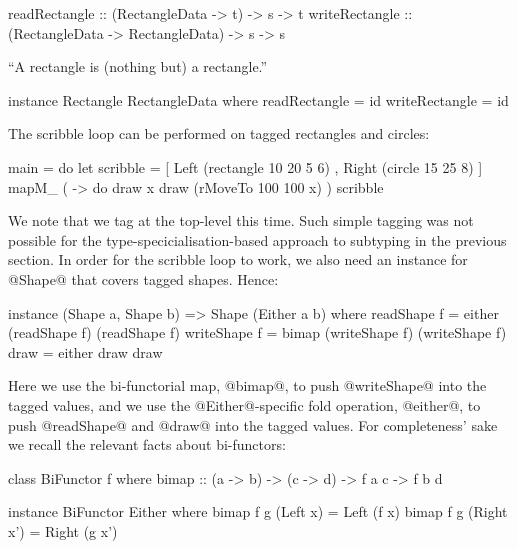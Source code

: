\documentclass{jfp}
\begin{document}
\begin{code}
   readRectangle  :: (RectangleData -> t)         -> s -> t
   writeRectangle :: (RectangleData -> RectangleData) -> s -> s
\end{code}

``A rectangle is (nothing but) a rectangle.''

\begin{code}
 instance Rectangle RectangleData
  where
   readRectangle  = id
   writeRectangle = id
\end{code}

The scribble loop can be performed on tagged rectangles and circles:

\begin{code}
 main =
       do
          let scribble = [ Left  (rectangle 10 20 5 6)
                         , Right (circle 15 25 8)
                         ]
          mapM_ ( \x -> 
                    do
                       draw x
                       draw (rMoveTo 100 100 x)
                )
                scribble
\end{code}

We note that we tag at the top-level this time. Such simple tagging
was not possible for the type-specicialisation-based approach to
subtyping in the previous section. In order for the scribble loop to
work, we also need an instance for @Shape@ that covers tagged
shapes. Hence:

\begin{code}
 instance (Shape a, Shape b) => Shape (Either a b)
  where
   readShape  f = either (readShape f)  (readShape f)
   writeShape f = bimap  (writeShape f) (writeShape f)
   draw         = either draw draw
\end{code}

Here we use the bi-functorial map, @bimap@, to push @writeShape@ into
the tagged values, and we use the @Either@-specific fold operation,
@either@, to push @readShape@ and @draw@ into the tagged values. For
completeness' sake we recall the relevant facts about bi-functors:

\begin{code}
 class BiFunctor f where
   bimap :: (a -> b) -> (c -> d) -> f a c -> f b d
\end{code}

\begin{code}
 instance BiFunctor Either where
   bimap f g (Left  x)  = Left (f x)
   bimap f g (Right x') = Right (g x')
\end{code}
\end{document}

